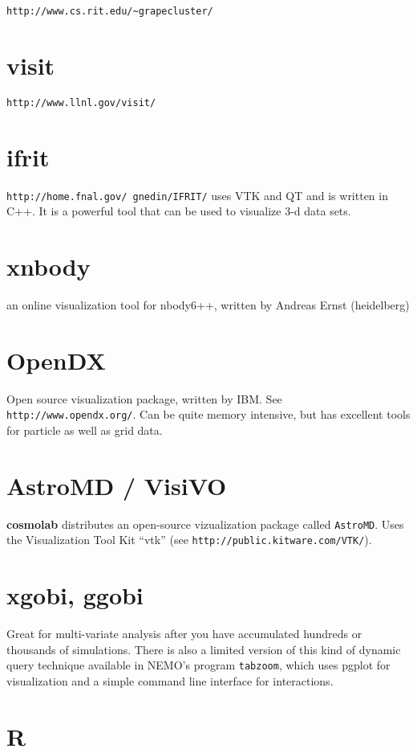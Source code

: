 \begin{itemize}
\begin{itemize}
\verb+http://www.cs.rit.edu/~grapecluster/+

\section{visit}

{\tt http://www.llnl.gov/visit/}

\section{ifrit}

{\tt http://home.fnal.gov/~gnedin/IFRIT/}
uses VTK and QT and is
written in C++. It is a powerful
tool that can be used to visualize 3-d data sets.

\section{xnbody}

an online visualization tool for nbody6++, written by
Andreas Ernst (heidelberg)

\section{OpenDX}

Open source visualization package, written by IBM. See 
{\tt http://www.opendx.org/}. Can be quite memory intensive, but has
excellent tools for particle as well as grid data.

\section{AstroMD / VisiVO}

{\bf cosmolab} distributes an open-source vizualization package 
called {\tt AstroMD}.  Uses the Visualization Tool Kit ``vtk''
(see {\tt http://public.kitware.com/VTK/}).

\section{xgobi, ggobi}

Great for multi-variate analysis after you have accumulated hundreds
or thousands of simulations. There is also a limited version of
this kind of dynamic query technique available in 
NEMO's program {\tt tabzoom}, which uses pgplot for visualization
and a simple command line interface for interactions.

\section{R}


\end{itemize}
\end{itemize}
